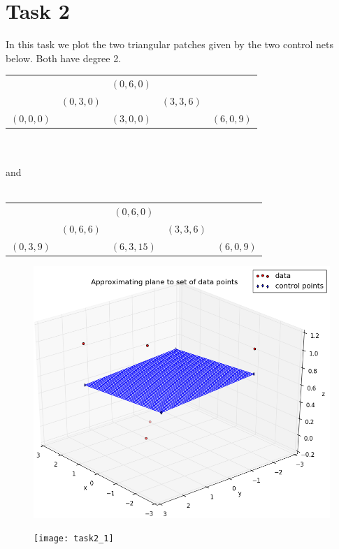 \documentclass[]{article}
\begin{document}
\section*{Task 2}
In this task we plot the two triangular patches given by the two control nets below. Both have degree 2. \\

\begin{tabular}{ ccccc }
   &  & $(0,6,0)$ & & \\
   & $(0,3,0)$ &  & $(3,3,6)$& \\
  $(0,0,0)$ & & $(3,0,0)$ & & $(6,0,9)$ \\
\end{tabular}\\
\\
and\\
\\

\begin{tabular}{ ccccc }
   &  & $(0,6,0)$ & & \\
   & $(0,6,6)$ &  & $(3,3,6)$& \\
  $(0,3,9)$ & & $(6,3,15)$ & & $(6,0,9)$ \\
\end{tabular}

\begin{figure}[h!]
	\includegraphics[scale=0.4]{plane}
\end{figure}

\begin{figure}[h!]
	\texttt{[image: task2\_1]}
\end{figure}
\end{document}
